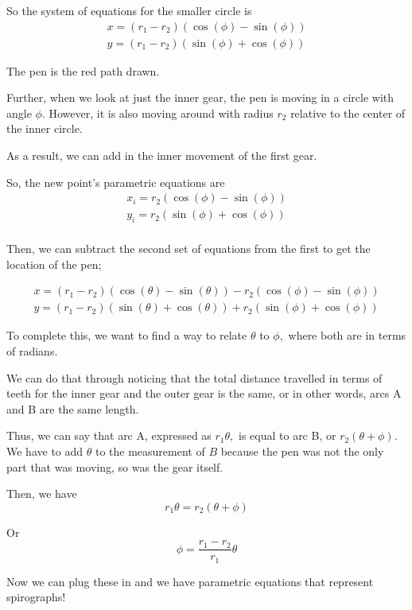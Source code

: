 \documentclass{article}
\begin{document}
So the system of equations for the smaller circle is 
\begin{align*}
    x = (r_1 - r_2) \left( \cos(\phi) - \sin(\phi) \right)\\
    y = (r_1 - r_2) \left( \sin(\phi) + \cos(\phi) \right)
\end{align*}

The pen is the red path drawn. 

Further, when we look at just the inner gear, the pen is moving in a circle with angle $\phi.$ However, it is also moving around with radius $r_2$ relative to the center of the inner circle. 

As a result, we can add in the inner movement of the first gear. 

So, the new point's parametric equations are 
\begin{align*}
    x_i = r_2 \left( \cos(\phi) - \sin(\phi) \right) \\
    y_i = r_2  \left( \sin(\phi) + \cos(\phi) \right) \\
\end{align*}

Then, we can subtract the second set of equations from the first to get the location of the pen; 

\begin{align*}
    x = (r_1 - r_2) \left(\cos(\theta) - \sin(\theta) \right) - r_2  \left( \cos(\phi) - \sin(\phi) \right) \\
    y = (r_1 - r_2)(\sin(\theta) + \cos(\theta)) + r_2 (\sin(\phi) + \cos(\phi))
\end{align*}

To complete this, we want to find a way to relate $\theta$ to $\phi,$ where both are in terms of radians.

We can do that through noticing that the total distance travelled in terms of teeth for the inner gear and the outer gear is the same, or in other words, arcs A and B are the same length.

Thus, we can say that arc A, expressed as $r_1 \theta,$ is equal to arc B, or $r_2 (\theta + \phi).$ We have to add $\theta$ to the measurement of $B$ because the pen was not the only part that was moving, so was the gear itself. 

Then, we have $$r_1 \theta = r_2 (\theta + \phi)$$

Or $$ \phi = \frac{r_1 - r_2}{r_1}  \theta$$

Now we can plug these in and we have parametric equations that represent spirographs!
\end{document}
